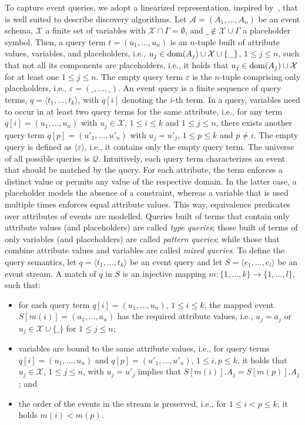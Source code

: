 To capture event queries, we adopt a linearized
representation,
inspired by~\cite{DBLP:conf/btw/Kleest-Meissner23},
that is well suited to describe discovery algorithms.
Let $\mathcal{A} =
(A_1, \ldots, A_n)$ be an event schema, $\mathcal{X}$ a finite set of variables
with $\mathcal{X}\cap
\Gamma=\emptyset$, and $\_ \notin \mathcal{X}\cup
\Gamma$ a placeholder symbol. Then, a query term
$t=(u_{1},\ldots,u_{n})$ is an $n$-tuple built of attribute
values, variables, and placeholders, i.e.,
$u_{j}\in \operatorname{dom}(A_j) \cup \mathcal{X} \cup \{ \_ \}$, $1\leq j\leq n$, such that
not all its components are placeholders, i.e., it holds that $u_{j}\in
\operatorname{dom}(A_j) \cup \mathcal{X}$ for at least one $1\leq j\leq n$.
The empty query term $\varepsilon$ is the $n$-tuple comprising only
placeholders, i.e., 
$\varepsilon=(\_,\dots,\_)$.
An event
query is a finite sequence of query terms, $q=\langle t_1,\ldots,t_k \rangle$,
with $q[i]$ denoting the $i$-th term. In a query, variables need to occur in at
least two query terms for the same attribute, i.e., for any term
$q[i]=(u_{1},\ldots,u_{n})$ with $u_j\in \mathcal{X}$,
$1\leq i\leq k$ and $1\leq j\leq n$, there exists another query term
$q[p]=(u'_{1},\ldots,u'_{n})$ with $u_j = u'_j$,
$1\leq p\leq k$ and $p\neq i$. The empty query is defined as
$\langle\varepsilon\rangle$, i.e., it contains only the empty query term.
The universe of all possible queries is $\mathcal{Q}$.
Intuitively, each query term characterizes an event that should be matched by
the query. For each attribute, the term enforces a distinct value or
permits any value of the respective domain. In the latter case, a placeholder
models the absence of a constraint, whereas a variable that is used multiple
times enforces equal attribute values.
This way, equivalence
predicates over attributes of events are modelled.
Queries built of terms that contain only attribute values (and
placeholders) are called \emph{type queries}; those built of terms of only
variables (and placeholders) are called \emph{pattern queries}; while those
that combine attribute values and variables are called \emph{mixed queries}.
To define the query semantics,
let $q=\langle t_1,\ldots,t_k \rangle$ be an event query and
let $S=\langle e_1, \ldots , e_l\rangle$ be an event stream.
A match of $q$ in $S$ is an injective mapping
$m: \{1,\ldots,k\}\rightarrow \{1, \ldots, l\}$,
such that:
\begin{itemize}[nosep,left=1em]
	\item for each query term $q[i]=(u_{1},\ldots,u_{n})$, $1\leq i\leq k$, the
	mapped event $S[m(i)]=(a_1,\ldots, a_n)$ has the required
	attribute
	values, i.e., $u_j = a_j$ or $u_j\in \mathcal{X}\cup \{\_ \}$
	for $1\leq 	j\leq n$;
	\item variables are bound to the same attribute values, i.e., for query
	terms $q[i]=(u_1,\ldots, u_n)$ and $q[p]=(u'_1,\ldots, u'_n)$, $1\leq
	i,p\leq k$, it holds that $u_j\in \mathcal{X}$, $1\leq j\leq n$, with
	$u_j=u'_j$ implies that $S[m(i)].A_j = S[m(p)].A_j$; and
 	\item the order of the events in the stream is preserved,
 	i.e., for $1\leq
	i<p\leq k$, it holds $m(i)<m(p)$.
\end{itemize}
